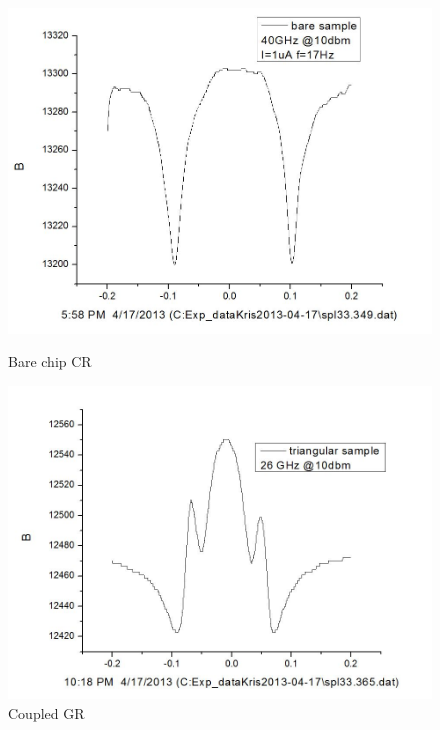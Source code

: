 \documentclass[12pt]{ruthesis}
\begin{document}
\begin{figure}[!htb]\centering
   \begin{minipage}{0.49\textwidth}
     \includegraphics[width=\linewidth]{figures/bare_cr.JPG}
     \caption{Bare chip CR}\label{bare_cr}
   \end{minipage}
   \begin {minipage}{0.49\textwidth}
     \includegraphics[width=\linewidth]{figures/coupled_cr.JPG}
     \caption{Coupled GR}\label{coupled_cr}
   \end{minipage}
\end{figure}




\cite{PhysRevB.28.4875}
\end{document}
